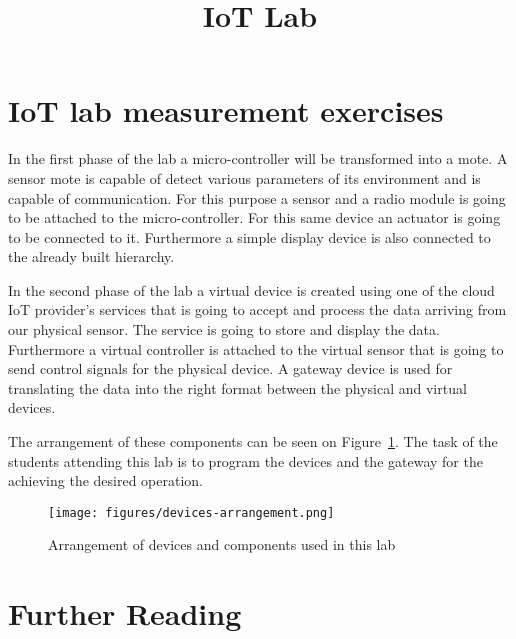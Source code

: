 \documentclass[a4paper]{article}
\title{IoT Lab}
\author{}
\date{}
\begin{document}
\maketitle

\tableofcontents

\section{IoT lab measurement exercises}

In the first phase of the lab a micro-controller will be transformed into a mote. A sensor mote is capable of detect various parameters of its environment and is capable of communication. For this purpose a sensor and a radio module is going to be attached to the micro-controller. For this same device an actuator is going to be connected to it. Furthermore a simple display device is also connected to the already built hierarchy.

In the second phase of the lab a virtual device is created using one of the cloud IoT provider's services that is going to accept and process the data arriving from our physical sensor. The service is going to store and display the data. Furthermore a virtual controller is attached to the virtual sensor that is going to send control signals for the physical device. A gateway device is used for translating the data into the right format between the physical and virtual devices.

The arrangement of these components can be seen on Figure~\ref{fig:meas-arrangement}. The task of the students attending this lab is to program the devices and the gateway for the achieving the desired operation.

\begin{figure}[H]
    \centering
    \texttt{[image: figures/devices-arrangement.png]}
    \caption{Arrangement of devices and components used in this lab}
    \label{fig:meas-arrangement}
\end{figure}

\section{Further Reading}
\end{document}
